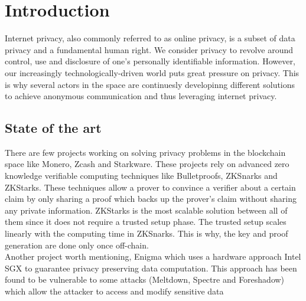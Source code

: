
\begin{abstract}

\end{abstract}
\section{Introduction}
Internet privacy, also commonly referred to as online privacy, is a subset of data privacy and a fundamental human right. We consider privacy to revolve around control, use and disclosure of one’s personally identifiable information.
However, our increasingly technologically-driven world puts great pressure on privacy. 
This is why several actors in the space are continuesly developinng different solutions to achieve anonymous communication and thus leveraging internet privacy.


\subsection*{State of the art}
There are few projects working on solving privacy problems in the blockchain space like Monero, Zcash and Starkware. These projects rely on advanced zero knowledge verifiable computing techniques like Bulletproofs, ZKSnarks  and ZKStarks. These techniques allow a prover to convince a verifier about a certain claim by only sharing a proof which backs up the prover’s claim without sharing any private information. ZKStarks is the most scalable solution between all of them since it does not require a trusted setup phase. The trusted setup scales linearly with the computing time in ZKSnarks. This is why, the key and proof generation are done only once off-chain. 
\\Another project worth mentioning, Enigma which uses a hardware approach Intel SGX to guarantee privacy preserving data computation. This approach has been found to be vulnerable to some attacks (Meltdown, Spectre and Foreshadow) which allow the attacker to access and modify sensitive data




